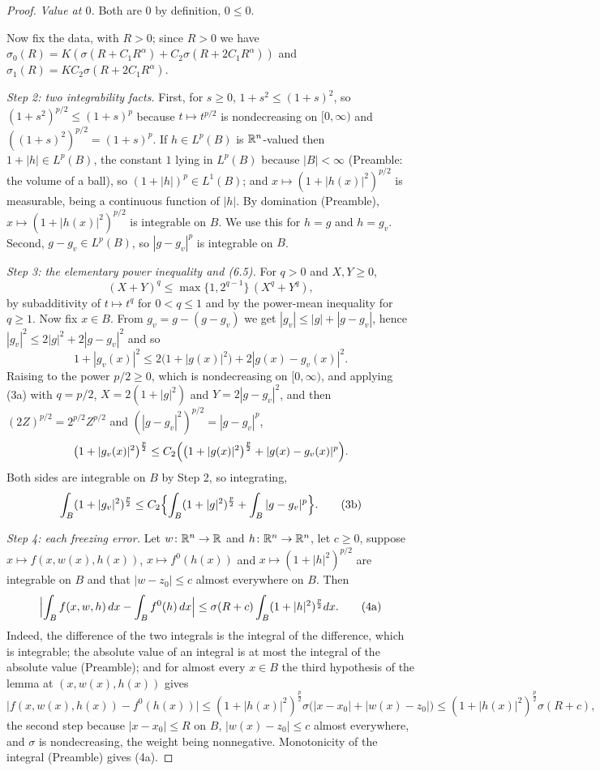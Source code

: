 \begin{proof}
\emph{Value at $0$.}  Both are $0$ by definition, $0\le0$.

Now fix the data, with $R>0$; since $R>0$ we have $\sigma_0(R)=
K(\sigma(R+C_1R^{\alpha})+C_2\sigma(R+2C_1R^{\alpha}))$ and
$\sigma_1(R)=KC_2\sigma(R+2C_1R^{\alpha})$.

\emph{Step 2: two integrability facts.}  First, for $s\ge0$,
$1+s^2\le(1+s)^2$, so $(1+s^2)^{p/2}\le(1+s)^{p}$ because $t\mapsto t^{p/2}$ is
nondecreasing on $[0,\infty)$ and $((1+s)^2)^{p/2}=(1+s)^p$.  If
$h\in L^p(B)$ is $\mathbb{R}^n$-valued then $1+|h|\in L^p(B)$, the constant $1$ lying
in $L^p(B)$ because $|B|<\infty$ (Preamble: the volume of a ball), so
$(1+|h|)^p\in L^1(B)$; and $x\mapsto(1+|h(x)|^2)^{p/2}$ is measurable, being a
continuous function of $|h|$.  By domination (Preamble),
$x\mapsto(1+|h(x)|^2)^{p/2}$ is integrable on $B$.  We use this for $h=g$ and
$h=g_v$.  Second, $g-g_v\in L^p(B)$, so $|g-g_v|^p$ is integrable on $B$.

\emph{Step 3: the elementary power inequality and \textup{(6.5)}.}  For
$q>0$ and $X,Y\ge0$,
\[
(X+Y)^q\le\max\{1,2^{q-1}\}\,(X^q+Y^q),
\tag{3a}
\]
by subadditivity of $t\mapsto t^q$ for $0<q\le1$ and by the power-mean
inequality for $q\ge1$.  Now fix $x\in B$.  From $g_v=g-(g-g_v)$ we get
$|g_v|\le|g|+|g-g_v|$, hence
$|g_v|^2\le2|g|^2+2|g-g_v|^2$ and so
\[
1+|g_v(x)|^2\le2\bigl(1+|g(x)|^2\bigr)+2|g(x)-g_v(x)|^2 .
\]
Raising to the power $p/2\ge0$, which is nondecreasing on $[0,\infty)$, and
applying (3a) with $q=p/2$, $X=2(1+|g|^2)$ and $Y=2|g-g_v|^2$, and then
$(2Z)^{p/2}=2^{p/2}Z^{p/2}$ and $(|g-g_v|^2)^{p/2}=|g-g_v|^p$,
\[
\bigl(1+|g_v(x)|^2\bigr)^{\frac p2}
\le C_2\Bigl(\bigl(1+|g(x)|^2\bigr)^{\frac p2}+|g(x)-g_v(x)|^{p}\Bigr).
\]
Both sides are integrable on $B$ by Step 2, so integrating,
\[
\int_B(1+|g_v|^2)^{\frac p2}
\le C_2\Bigl\{\int_B(1+|g|^2)^{\frac p2}+\int_B|g-g_v|^{p}\Bigr\}.
\tag{3b}
\]

\emph{Step 4: each freezing error.}  Let $w\colon\mathbb{R}^n\to\mathbb{R}$ and
$h\colon\mathbb{R}^n\to\mathbb{R}^n$, let $c\ge0$, suppose $x\mapsto f(x,w(x),h(x))$,
$x\mapsto f^0(h(x))$ and $x\mapsto(1+|h|^2)^{p/2}$ are integrable on $B$ and
that $|w-z_0|\le c$ almost everywhere on $B$.  Then
\[
\Bigl|\int_Bf(x,w,h)\,dx-\int_Bf^0(h)\,dx\Bigr|
\le\sigma(R+c)\int_B(1+|h|^2)^{\frac p2}dx .
\tag{4a}
\]
Indeed, the difference of the two integrals is the integral of the difference,
which is integrable; the absolute value of an integral is at most the integral
of the absolute value (Preamble); and for almost every $x\in B$ the third
hypothesis of the lemma at $(x,w(x),h(x))$ gives
\[
\bigl|f(x,w(x),h(x))-f^0(h(x))\bigr|
\le(1+|h(x)|^2)^{\frac p2}\sigma\bigl(|x-x_0|+|w(x)-z_0|\bigr)
\le(1+|h(x)|^2)^{\frac p2}\sigma(R+c),
\]
the second step because $|x-x_0|\le R$ on $B$, $|w(x)-z_0|\le c$ almost
everywhere, and $\sigma$ is nondecreasing, the weight being nonnegative.
Monotonicity of the integral (Preamble) gives (4a).


\end{proof}

